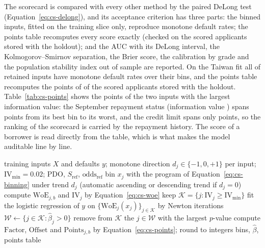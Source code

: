 The scorecard is compared with every other method by the paired DeLong test (Equation~\eqref{eq:cs-delong}), and its acceptance
criterion has three parts: the binned inputs, fitted on the training slice only, reproduce monotone default rates; the points
table recomputes every score exactly (checked on the \csPointsN{} scored applicants stored with the holdout); and the AUC with its DeLong interval, the Kolmogorov--Smirnov separation, the Brier score,
the calibration by grade and the population stability index out of sample are reported. On the Taiwan fit all
\csPointsMonotone{} of \csPointsFeatures{} retained inputs have monotone default rates over their bins, and the points table
recomputes the points of \csPointsMatch{} of the \csPointsN{} scored applicants stored with the holdout. Table~\ref{tab:cs-points}
shows the points of the two inputs with the largest information value: the September repayment status
(information value \csFitTwIvMax{}) spans \csPointsSpanPayZero{} points from its best bin to its worst, and the credit limit
spans only \csPointsSpanLimit{} points, so the ranking of the scorecard is carried by the repayment history. The score of a borrower is read directly from the table, which is what makes the
model auditable line by line.



\begin{algorithm}[htbp]
\caption{Fit of the monotone weight-of-evidence scorecard on the training slice}
\label{alg:cs-scorecard}
\begin{algorithmic}[1]
\Require training inputs $X$ and defaults $y$; monotone direction $d_j\in\{-1,0,+1\}$ per input; $\mathrm{IV}_{\min}=0.02$; PDO, $S_{\mathrm{ref}}$, $\text{odds}_{\mathrm{ref}}$
  \State bin $x_j$ with the program of Equation~\eqref{eq:cs-binning} under trend $d_j$ (automatic ascending or descending trend if $d_j=0$)
  \State compute $\mathrm{WoE}_{j,b}$ and $\mathrm{IV}_j$ by Equation~\eqref{eq:cs-woe}
\EndFor
\State keep $\mathcal{K}=\{j:\mathrm{IV}_j\ge \mathrm{IV}_{\min}\}$
\Repeat
  \State fit the logistic regression of $y$ on $\{\mathrm{WoE}_j(x_j)\}_{j\in\mathcal{K}}$ by Newton iterations
  \State $\mathcal{W}\gets\{j\in\mathcal{K}:\hat\beta_j>0\}$
   \State remove from $\mathcal{K}$ the $j\in\mathcal{W}$ with the largest $p$-value \EndIf
{}
\State compute $\text{Factor}$, $\text{Offset}$ and $\text{Points}_{j,b}$ by Equation~\eqref{eq:cs-points}; round to integers
\State \Return bins, $\hat\beta$, points table
\end{algorithmic}
\end{algorithm}

